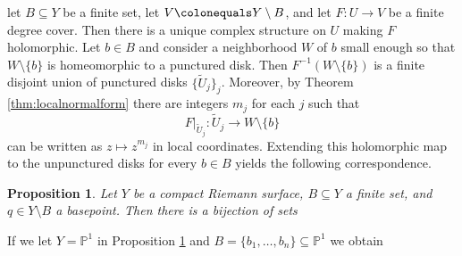 \documentclass{dcthesis}
\newcommand{\PP}{\mathbb P}
\newcommand{\wt}[1]{\widetilde{#1}}
\newcommand{\sm}{\setminus}
\newtheorem{prop}{Proposition}[section]
\theoremstyle{definition}
\theoremstyle{remark}
\numberwithin{equation}{section}
\numberwithin{figure}{section}
\begin{document}
{{    let $B\subseteq Y$ be a finite set,
    let $V\colonequals Y\sm B$,
    and let $F\colon U\to V$ be a finite degree cover.
    Then there is a unique complex structure on $U$
    making $F$ holomorphic.
    Let $b\in B$
    and consider a neighborhood $W$ of $b$
    small enough so that $W\sm \{b\}$ is homeomorphic to a punctured disk.
    Then $F^{-1}(W\sm \{b\})$ is a finite disjoint union
    of punctured disks $\{\wt{U}_j\}_j$.
    Moreover,
    by Theorem \ref{thm:localnormalform}
    there are integers $m_j$ for each $j$ such that
    \[
      F|_{\wt{U}_j}\colon\wt{U}_j\to W\sm \{b\}
    \]
    can be written as $z\mapsto z^{m_j}$ in local coordinates.
    Extending this holomorphic map to the unpunctured disks
    for every $b\in B$ yields the following correspondence.
    \begin{prop}
      \label{prop:branchedcoverofriemannsurfaces}
      Let $Y$ be a compact Riemann surface,
      $B\subseteq Y$ a finite set,
      and $q\in Y\sm B$ a basepoint.
      Then there is a bijection of sets
      \begin{center}
      \end{center}
    \end{prop}
    If we let $Y = \PP^1$ in Proposition \ref{prop:branchedcoverofriemannsurfaces}
    and $B = \{b_1,\ldots,b_n\}\subseteq\PP^1$ we obtain
}}
\end{document}
